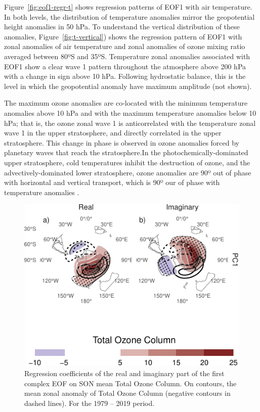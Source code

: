 \documentclass[smallextended]{svjour3}       %
\begin{document}
Figure~\ref{fig:eof1-regr-t} shows regression patterns of EOF1 with air temperature. In both levels, the distribution of temperature anomalies mirror the geopotential height anomalies in 50 hPa. To understand the vertical distribution of these anomalies, Figure~\ref{fig:t-vertical}) shows the regression pattern of EOF1 with zonal anomalies of air temperature and zonal anomalies of ozone mixing ratio averaged between 80ºS and 35ºS. Temperature zonal anomalies associated with EOF1 show a clear wave 1 pattern throughout the atmosphere above 200 hPa with a change in sign above 10 hPa. Following hydrostatic balance, this is the level in which the geopotential anomaly have maximum amplitude (not shown).

The maximum ozone anomalies are co-located with the minimum temperature anomalies above 10 hPa and with the maximum temperature anomalies below 10 hPa; that is, the ozone zonal wave 1 is anticorrelated with the temperature zonal wave 1 in the upper stratosphere, and directly correlated in the upper stratosphere. This change in phase is observed in ozone anomalies forced by planetary waves that reach the stratosphere.In the photochemically-dominated upper stratosphere, cold temperatures inhibit the destruction of ozone, and the advectively-dominated lower stratosphere, ozone anomalies are 90º out of phase with horizontal and vertical transport, which is 90º our of phase with temperature anomalies \citep{hartmann1979, wirth1993, smith1995}.



\begin{figure}
\centering
\includegraphics{../figures/o3-regr-1.pdf}
\caption{\label{fig:o3-regr}Regression coefficients of the real and imaginary part of the first complex EOF on SON mean Total Ozone Column. On contours, the mean zonal anomaly of Total Ozone Column (negative contours in dashed lines). For the 1979 -- 2019 period.}
\end{figure}
\end{document}
